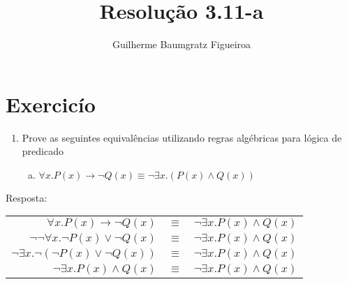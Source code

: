 \documentclass[aspectratio=43]{beamer}
\title[\sc{Resolu\c c\~ao}]{Resolu\c c\~ao 3.11-a}
\author[Guilherme Baumgratz Figueiroa]{Guilherme Baumgratz Figueiroa}
\institute[UFOP]{Universidade Federal de Ouro Preto} %
\date{}
\begin{document}
	
\begin{frame}
	\titlepage
\end{frame}

\section{Exercic\'io}

\begin{frame}%
	\begin{enumerate}[1.]
		\item Prove as seguintes equival\^encias utilizando regras alg\'ebricas para l\'ogica de predicado

	\begin{enumerate}[a)]
		
		\item $\forall x.P(x)\to\neg Q(x) \equiv \neg\exists x.(P(x)\land Q(x))$ \\
		
	\end{enumerate}
	
	\end{enumerate}
	Resposta:
	\\
	\centering
	\pause
	
	\begin{tabular}{rcl}
		$\forall x. P(x)\to\neg Q(x)$ & $\equiv$ & $\neg\exists x.P(x)\land Q(x)$\\
		\pause
		$\neg \neg \forall x.\neg P(x)\lor\neg Q(x)$  & $\equiv$ & $\neg\exists x.P(x)\land Q(x)$ \\
		\pause
		$\neg\exists x.\neg (\neg P(x)\lor\neg Q(x))$  & $\equiv$ & $\neg\exists x.P(x)\land Q(x)$ \\
		\pause
		$\neg\exists x. P(x) \land Q(x)$  & $\equiv$ & $\neg\exists x.P(x)\land Q(x)$ 
	\end{tabular}
	
	
\end{frame}
\end{document}
